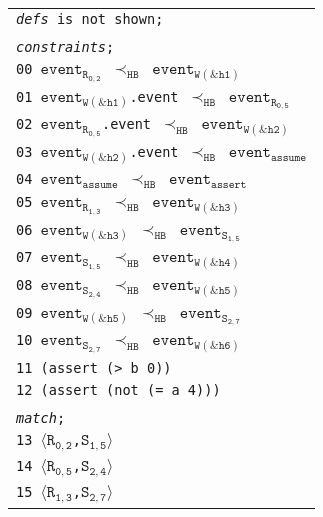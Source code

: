 \newsavebox{\boxSMTb}
\begin{lrbox}{\boxSMTb}
\normalsize
\begin{tabular}[c]{l}
\texttt{\textit{defs} is not shown;}\\
\\
\texttt{\textit{constraints};}\\
\texttt{00 $\mathtt{event_{R_{0,2}}}$ $\mathtt{\prec_{HB}}$ $\mathtt{event_{W(\&h1)}}$}\\
\texttt{01 $\mathtt{event_{W(\&h1)}}$.event $\mathtt{\prec_{HB}}$ $\mathtt{event_{R_{0,5}}}$}\\
\texttt{02 $\mathtt{event_{R_{0,5}}}$.event $\mathtt{\prec_{HB}}$ $\mathtt{event_{W(\&h2)}}$}\\
\texttt{03 $\mathtt{event_{W(\&h2)}}$.event $\mathtt{\prec_{HB}}$ $\mathtt{event_{assume}}$}\\
\texttt{04 $\mathtt{event_{assume}}$ $\mathtt{\prec_{HB}}$ $\mathtt{event_{assert}}$}\\
\texttt{05 $\mathtt{event_{R_{1,3}}}$ $\mathtt{\prec_{HB}}$ $\mathtt{event_{W(\&h3)}}$}\\
\texttt{06 $\mathtt{event_{W(\&h3)}}$ $\mathtt{\prec_{HB}}$ $\mathtt{event_{S_{1,5}}}$}\\
\texttt{07 $\mathtt{event_{S_{1,5}}}$ $\mathtt{\prec_{HB}}$ $\mathtt{event_{W(\&h4)}}$}\\
\texttt{08 $\mathtt{event_{S_{2,4}}}$ $\mathtt{\prec_{HB}}$ $\mathtt{event_{W(\&h5)}}$}\\
\texttt{09 $\mathtt{event_{W(\&h5)}}$ $\mathtt{\prec_{HB}}$ $\mathtt{event_{S_{2,7}}}$}\\
\texttt{10 $\mathtt{event_{S_{2,7}}}$ $\mathtt{\prec_{HB}}$ $\mathtt{event_{W(\&h6)}}$}\\
\texttt{11 (assert (> b 0))}\\
\texttt{12 (assert (not (= a 4)))}\\
\\
\texttt{\textit{match};}\\
\texttt{13 $\langle\mathtt{R_{0,2}}$,$\mathtt{S_{1,5}}\rangle$}\\
\texttt{14 $\langle\mathtt{R_{0,5}}$,$\mathtt{S_{2,4}}\rangle$}\\
\texttt{15 $\langle\mathtt{R_{1,3}}$,$\mathtt{S_{2,7}}\rangle$}\\

\end{tabular}
\end{lrbox}

